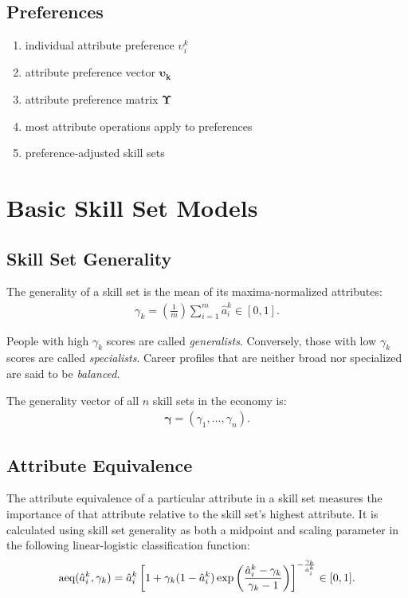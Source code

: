 \documentclass{elsarticle} %
\begin{document}
\subsection{Preferences}
\begin{enumerate}
    \item individual attribute preference $\upsilon_{i}^{k}$
    \item attribute preference vector $\boldsymbol{\upsilon_k}$
    \item attribute preference matrix $\boldsymbol{\Upsilon}$
    \item most attribute operations apply to preferences
    \item preference-adjusted skill sets
\end{enumerate}


\section{Basic Skill Set Models}
\subsection{Skill Set Generality}
The generality of a skill set is the mean of its maxima-normalized attributes:
\begin{gather}
    \gamma_{k} = \left(\frac{1}{m}\right)\sum_{i=1}^{m}{\hat{a}_{i}^{k}}
    \in [0,1]
    .
\end{gather}

People with high $\gamma_{k}$ scores are called \textit{generalists}.
Conversely, those with low $\gamma_{k}$ scores are called \textit{specialists}.
Career profiles that are neither broad nor specialized are said to be
\textit{balanced}.

The generality vector of all $n$ skill sets in the economy is:
\begin{gather}
    \boldsymbol{\gamma} = (\gamma_{1}, \dots, \gamma_{n})
    .
\end{gather}

\subsection{Attribute Equivalence}
The attribute equivalence of a particular attribute in a skill set measures the
importance of that attribute relative to the skill set's highest attribute. It
is calculated using skill set generality as both a midpoint and scaling
parameter in the following linear-logistic classification function:
\begin{gather}
    \text{aeq}(\hat{a}_{i}^{k}, \gamma_{k}) =
    \hat{a}_{i}^{k}
    \left[
        1 + \gamma_{k} (1 - \hat{a}_{i}^{k})
        \exp\bigg(
        \frac{\hat{a}_{i}^{k} - \gamma_{k}}{\gamma_{k} - 1}
        \bigg)
        \right] ^ {
    -\frac{\gamma_{k}}{\hat{a}_{i}^{k}}
    }
    \in [0,1]
    .
\end{gather}
\end{document}
